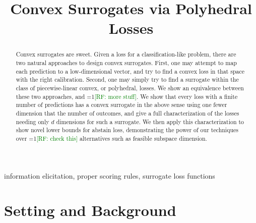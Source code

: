\documentclass[anon,12pt]{colt2019}
\title{Convex Surrogates via Polyhedral Losses}
\newcommand{\Comments}{1}
\newcommand{\mynote}[2]{\ifnum\Comments=1\textcolor{#1}{#2}\fi}
\newcommand{\raf}[1]{\mynote{green}{[RF: #1]}}
\begin{document}
\maketitle

\begin{abstract}
  Convex surrogates are sweet.
  Given a loss for a classification-like problem, there are two natural approaches to design convex surrogates.
  First, one may attempt to map each prediction to a low-dimensional vector, and try to find a convex loss in that space with the right calibration.
  Second, one may simply try to find a surrogate within the class of piecewise-linear convex, or polyhedral, losses.
  We show an equivalence between these two approaches, and \raf{more stuff}.
  We show that every loss with a finite number of predictions has a convex surrogate in the above sense using one fewer dimension that the number of outcomes, and give a full characterization of the losses needing only $d$ dimensions for such a surrogate.
  We then apply this characterization to show novel lower bounds for abstain loss, demonstrating the power of our techniques over \raf{check this} alternatives such as feasible subspace dimension.
\end{abstract}
\begin{keywords}%
  information elicitation, proper scoring rules, surrogate loss functions
\end{keywords}


\section{Setting and Background}
\end{document}
